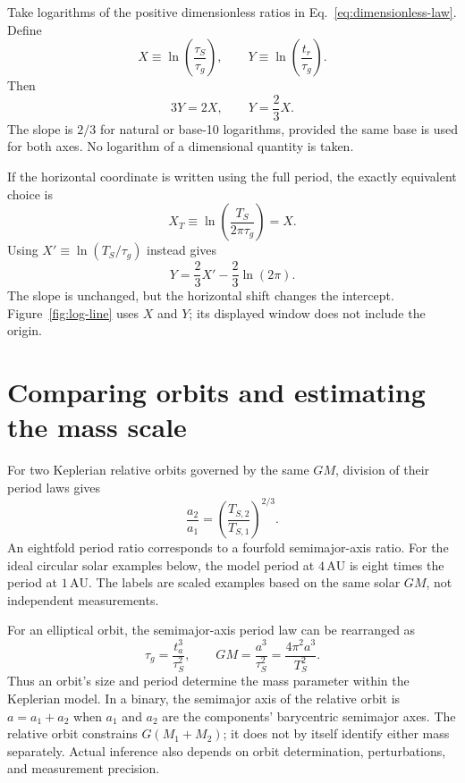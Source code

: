 \documentclass[12pt]{article}
\begin{document}
Take logarithms of the positive dimensionless ratios in Eq.~\eqref{eq:dimensionless-law}. Define
\begin{equation}
  X\equiv\ln\!\left(\frac{\tau_S}{\tau_g}\right),
  \qquad
  Y\equiv\ln\!\left(\frac{t_r}{\tau_g}\right).
  \label{eq:log-coordinates}
\end{equation}
Then
\begin{equation}
  3Y=2X,
  \qquad
  Y=\frac{2}{3}X.
  \label{eq:log-line}
\end{equation}
The slope is $2/3$ for natural or base-10 logarithms, provided the same base is used for both axes. No logarithm of a dimensional quantity is taken.

If the horizontal coordinate is written using the full period, the exactly equivalent choice is
\begin{equation}
  X_T\equiv\ln\!\left(\frac{T_S}{2\pi\tau_g}\right)=X.
  \label{eq:full-period-log}
\end{equation}
Using $X'\equiv\ln(T_S/\tau_g)$ instead gives
\begin{equation}
  Y=\frac{2}{3}X'-\frac{2}{3}\ln(2\pi).
  \label{eq:full-period-intercept}
\end{equation}
The slope is unchanged, but the horizontal shift changes the intercept. Figure~\ref{fig:log-line} uses $X$ and $Y$; its displayed window does not include the origin.

\section{Comparing orbits and estimating the mass scale}
\label{sec:comparison}

For two Keplerian relative orbits governed by the same $GM$, division of their period laws gives
\begin{equation}
  \frac{a_2}{a_1}
  =\left(\frac{T_{S,2}}{T_{S,1}}\right)^{2/3}.
  \label{eq:orbit-ratio}
\end{equation}
An eightfold period ratio corresponds to a fourfold semimajor-axis ratio. For the ideal circular solar examples below, the model period at $4\,\mathrm{AU}$ is eight times the period at $1\,\mathrm{AU}$. The labels are scaled examples based on the same solar $GM$, not independent measurements.

For an elliptical orbit, the semimajor-axis period law can be rearranged as
\begin{equation}
  \tau_g=\frac{t_a^3}{\tau_S^2},
  \qquad
  GM=\frac{a^3}{\tau_S^2}
    =\frac{4\pi^2a^3}{T_S^2}.
  \label{eq:mass-inference}
\end{equation}
Thus an orbit's size and period determine the mass parameter within the Keplerian model. In a binary, the semimajor axis of the relative orbit is $a=a_1+a_2$ when $a_1$ and $a_2$ are the components' barycentric semimajor axes. The relative orbit constrains $G(M_1+M_2)$; it does not by itself identify either mass separately. Actual inference also depends on orbit determination, perturbations, and measurement precision.
\end{document}

